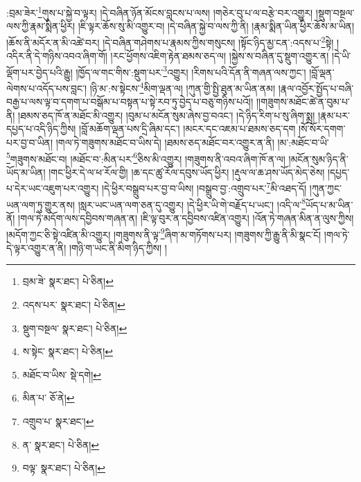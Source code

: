 :བྲམ་ཟེར་\footnote{བྲམ་ཟེ་  སྣར་ཐང་།  པེ་ཅིན། }གུས་པ་སྐྱེ་བ་ལྟར། །དེ་བཞིན་ཉོན་མོངས་བླངས་པ་ལས། །གཅེར་བུ་པ་ལ་བརྩེ་བར་འགྱུར། །སྡུག་བསྔལ་ལས་ཀྱི་རྣམ་སྨིན་ཕྱིར། །ཇི་ལྟར་ཆོས་སུ་མི་འགྱུར་བ། །དེ་བཞིན་སྐྱེ་བ་ལས་ཀྱི་ནི། །རྣམ་སྨིན་ཡིན་ཕྱིར་ཆོས་མ་ཡིན། །ཆོས་ནི་མདོར་ན་མི་འཚེ་བར། །དེ་བཞིན་གཤེགས་པ་རྣམས་ཀྱིས་གསུངས། །སྟོང་ཉིད་མྱ་ངན་:འདས་པ་\footnote{འདས་པར་  སྣར་ཐང་།  པེ་ཅིན། }སྟེ། །འདིར་ནི་དེ་གཉིས་འབའ་ཞིག་གོ། །རང་ཕྱོགས་འཇིག་རྟེན་ཐམས་ཅད་ལ། །སྐྱེས་ས་བཞིན་དུ་སྡུག་འགྱུར་ན། །དེ་ཡི་ལྡོག་པར་བྱེད་པའི་རྒྱུ། །ཁྱོད་ལ་གང་གིས་:སྡུག་པར་\footnote{སྡུག་བསྔལ་  སྣར་ཐང་།  པེ་ཅིན། }འགྱུར། །རིགས་པའི་དོན་ནི་གཞན་ལས་ཀྱང་། །བློ་ལྡན་ལེགས་པ་འདོད་པས་བླང་། །ཉི་མ་:ས་སྟེངས་\footnote{ས་སྟེང་  སྣར་ཐང་།  པེ་ཅིན། }མིག་ལྡན་ལ། །ཀུན་གྱི་སྤྱི་ཐུན་མ་ཡིན་ནམ། །རྣལ་འབྱོར་སྤྱོད་པ་བཞི་བརྒྱ་པ་ལས་ལྟ་བ་དགག་པ་བསྒོམ་པ་བསྟན་པ་སྟེ་རབ་ཏུ་བྱེད་པ་བཅུ་གཉིས་པའོ།། །།གཟུགས་མཐོང་ཚེ་ན་བུམ་པ་ནི། །ཐམས་ཅད་ཁོ་ན་མཐོང་མི་འགྱུར། །བུམ་པ་མངོན་སུམ་ཞེས་བྱ་བའང་། །དེ་ཉིད་རིག་པ་སུ་ཞིག་སྨྲ། །རྣམ་པར་དཔྱད་པ་འདི་ཉིད་ཀྱིས། །བློ་མཆོག་ལྡན་པས་དྲི་ཞིམ་དང་། །མངར་དང་འཇམ་པ་ཐམས་ཅད་དག །སོ་སོར་དགག་པར་བྱ་བ་ཡིན། །གལ་ཏེ་གཟུགས་མཐོང་བ་ཡིས་དེ། །ཐམས་ཅད་མཐོང་བར་འགྱུར་ན་ནི། །མ་:མཐོང་བ་ཡི་\footnote{མཐོང་བ་ཡིས་  སྡེ་དགེ། }གཟུགས་མཐོང་བ། །མཐོང་བ་:མིན་པར་\footnote{མིན་པ་  ཅོ་ནེ། }ཅིས་མི་འགྱུར། །གཟུགས་ནི་འབའ་ཞིག་ཁོ་ན་ལ། །མངོན་སུམ་ཉིད་ནི་ཡོད་མ་ཡིན། །གང་ཕྱིར་དེ་ལ་ཕ་རོལ་གྱི། །ཆ་དང་ཚུ་རོལ་དབུས་ཡོད་ཕྱིར། །རྡུལ་ལ་ཆ་ཤས་ཡོད་མེད་ཅེས། །དཔྱད་པ་དེར་ཡང་འཇུག་པར་འགྱུར། །དེ་ཕྱིར་བསྒྲུབ་པར་བྱ་བ་ཡིས། །བསྒྲུབ་བྱ་:འགྲུབ་པར་\footnote{འགྲུབ་པ་  སྣར་ཐང་། }མི་འཐད་དོ། །ཀུན་ཀྱང་ཡན་ལག་ཏུ་གྱུར་ནས། །སླར་ཡང་ཡན་ལག་ཅན་དུ་འགྱུར། །དེ་ཕྱིར་ཡི་གེ་བརྗོད་པ་ཡང་། །འདི་ལ་\footnote{ན་  སྣར་ཐང་།  པེ་ཅིན། }ཡོད་པ་མ་ཡིན་ནོ། །གལ་ཏེ་མདོག་ལས་དབྱིབས་གཞན་ན། །ཇི་ལྟ་བུར་ན་དབྱིབས་འཛིན་འགྱུར། །འོན་ཏེ་གཞན་མིན་ན་ལུས་ཀྱིས། །མདོག་ཀྱང་ཅི་སྟེ་འཛིན་མི་འགྱུར། །གཟུགས་ནི་ལྟ་\footnote{བལྟ་  སྣར་ཐང་།  པེ་ཅིན། }ཞིག་མ་གཏོགས་པར། །གཟུགས་ཀྱི་རྒྱུ་ནི་མི་སྣང་ངོ། །གལ་ཏེ་དེ་ལྟར་འགྱུར་ན་ནི། །གཉི་ག་ཡང་ནི་མིག་ཉིད་ཀྱིས། །
